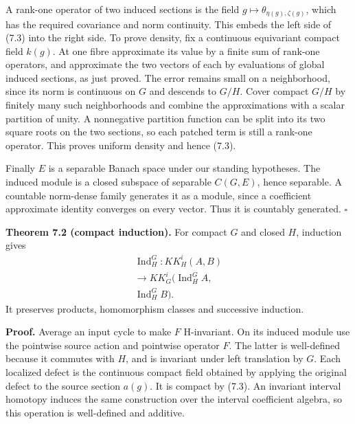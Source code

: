\documentclass[
  11pt,
]{article}
\begin{document}
A rank-one operator of two induced sections is the field
\(g\mapsto\theta_{\eta(g),\zeta(g)}\), which has the required covariance
and norm continuity. This embeds the left side of (7.3) into the right
side. To prove density, fix a continuous equivariant compact field
\(k(g)\). At one fibre approximate its value by a finite sum of rank-one
operators, and approximate the two vectors of each by evaluations of
global induced sections, as just proved. The error remains small on a
neighborhood, since its norm is continuous on \(G\) and descends to
\(G/H\). Cover compact \(G/H\) by finitely many such neighborhoods and
combine the approximations with a scalar partition of unity. A
nonnegative partition function can be split into its two square roots on
the two sections, so each patched term is still a rank-one operator.
This proves uniform density and hence (7.3).

Finally \(E\) is a separable Banach space under our standing hypotheses.
The induced module is a closed subspace of separable \(C(G,E)\), hence
separable. A countable norm-dense family generates it as a module, since
a coefficient approximate identity converges on every vector. Thus it is
countably generated. \(\square\)

\textbf{Theorem 7.2 (compact induction).} For compact \(G\) and closed
\(H\), induction gives \[
\begin{gathered}
\operatorname{Ind}_H^G:KK_H^i(A,B)\\
\longrightarrow KK_G^i(\operatorname{Ind}_H^G A,\\
       \operatorname{Ind}_H^G B).
\end{gathered}
\tag{7.5}
\] It preserves products, homomorphism classes and successive induction.

\textbf{Proof.} Average an input cycle to make \(F\) H-invariant. On its
induced module use the pointwise source action and pointwise operator
\(F\). The latter is well-defined because it commutes with \(H\), and is
invariant under left translation by \(G\). Each localized defect is the
continuous compact field obtained by applying the original defect to the
source section \(a(g)\). It is compact by (7.3). An invariant interval
homotopy induces the same construction over the interval coefficient
algebra, so this operation is well-defined and additive.
\end{document}
